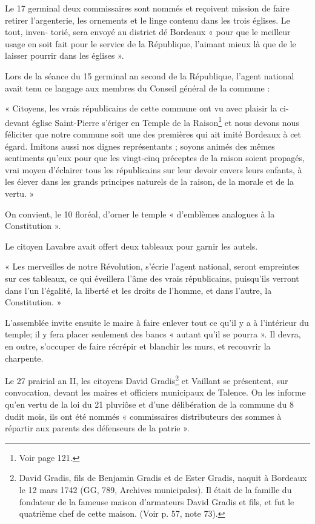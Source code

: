 \documentclass[a4paper,11pt]{book}
\begin{document}
Le 17 germinal deux commissaires sont nommés et reçoivent mission de faire retirer l'argenterie, les ornements et le linge contenu dans les trois églises. Le tout, inven-
torié, sera envoyé au district dé Bordeaux « pour que le meilleur usage en soit fait pour le service de la République, l'aimant mieux là que de le laisser pourrir dans les
églises ».

Lors de la séance du 15 germinal an second de la République, l'agent national avait tenu ce langage aux membres du Conseil général de la commune :

« Citoyens, les vrais républicains de cette commune ont vu avec plaisir la ci-devant église Saint-Pierre s'ériger en Temple de la Raison\footnote{Voir page 121.} et nous devons nous féliciter que notre commune soit une des premières qui ait imité Bordeaux à cet égard. Imitons aussi nos dignes représentants ; soyons animés des mêmes sentiments qu'eux pour que les vingt-cinq préceptes de la raison soient propagés, vrai moyen d'éclairer tous les républicains sur leur devoir envers leurs enfants, à les élever dans les grands principes naturels de la raison, de la morale et de la vertu. »

On convient, le 10 floréal, d'orner le temple « d'emblèmes analogues à la Constitution ».

Le citoyen Lavabre avait offert deux tableaux pour garnir les autels.

« Les merveilles de notre Révolution, s'écrie l'agent national, seront empreintes sur ces tableaux, ce qui éveillera l'âme des vrais républicains, puisqu'ils verront dans l'un l'égalité, la liberté et les droits de l'homme, et dans l'autre, la Constitution. »

L'assemblée invite ensuite le maire à faire enlever tout ce qu'il y a à l'intérieur du temple; il y fera placer seulement des bancs « autant qu'il se pourra ». Il devra, en
outre, s'occuper de faire récrépir et blanchir les murs, et recouvrir la charpente.

Le 27 prairial an II, les citoyens David Gradis\footnote{David Gradis, fils de Benjamin Gradis et de Ester Gradis, naquit à Bordeaux le 12 mars 1742 (GG, 789, Archives municipales). Il était de la famille du fondateur de la fameuse maison d'armateurs David Gradis et fils, et fut le quatrième chef de cette maison. (Voir p. 57, note 73).} et Vaillant se présentent, sur convocation, devant les maires et officiers municipaux de Talence. On les informe qu'en vertu de la loi du 21 pluviôse et d'une délibération de la commune du 8 dudit mois, ils ont été nommés « commissaires distributeurs des sommes à répartir aux parents des défenseurs de la patrie ».
\end{document}
